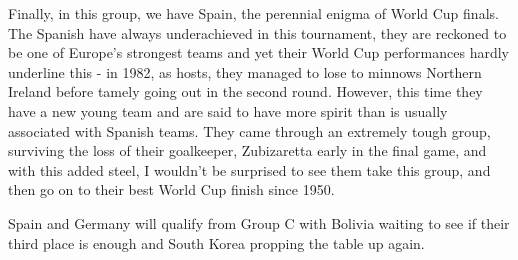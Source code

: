 Finally, in this group, we have Spain, the perennial enigma of World Cup finals.
The Spanish have always underachieved in this tournament, they are reckoned to
be one of Europe's strongest teams and yet their World Cup performances hardly 
underline this - in 1982, as hosts, they managed to lose to minnows Northern
Ireland before tamely going out in the second round. However, this time they
have a new young team and are said to have more spirit than is usually 
associated with Spanish teams. They came through an extremely tough group,
surviving the loss of their goalkeeper, Zubizaretta early in the final game,
and with this added steel, I wouldn't be surprised to see them take this group,
and then go on to their best World Cup finish since 1950.

Spain and Germany will qualify from Group C with Bolivia waiting to see if
their third place is enough and South Korea propping the table up again.
